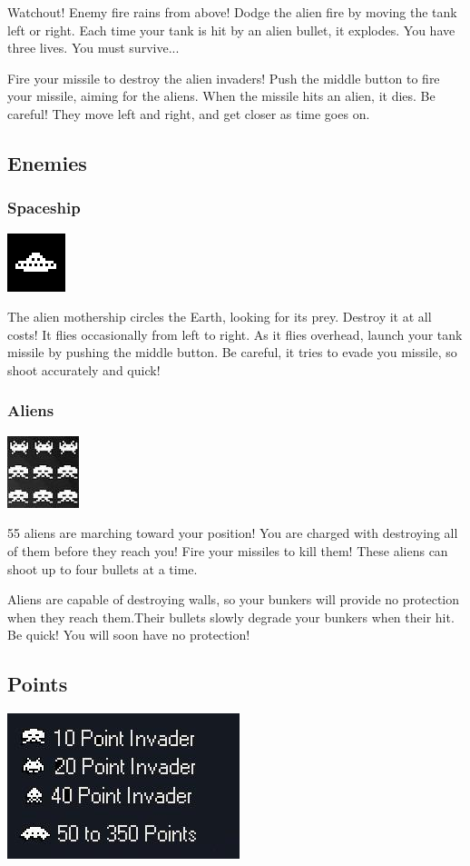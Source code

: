 \documentclass[11pt,letter,oneside]{report}
\begin{document}
Watchout! Enemy fire rains from above! Dodge the alien fire by moving the tank left or right. Each time your tank is hit by an alien bullet, it explodes. You have three lives.  You must survive...

Fire your missile to destroy the alien invaders! Push the middle button to fire your missile, aiming for the aliens. When the missile hits an alien, it dies. Be careful! They move left and right, and get closer as time goes on.

\subsection{Enemies}

\subsubsection{Spaceship}
\includegraphics[]{big-alien.png}

The alien mothership circles the Earth, looking for its prey. Destroy it at all costs! It flies occasionally from left to right. As it flies overhead, launch your tank missile by pushing the middle button. Be careful, it tries to evade you missile, so shoot accurately and quick!


\subsubsection{Aliens}
\includegraphics[]{aliens.jpg}

55 aliens are marching toward your position! You are charged with destroying all of them before they reach you! Fire your missiles to kill them! These aliens can shoot up to four bullets at a time. 

Aliens are capable of destroying walls, so your bunkers will provide no protection when they reach them.Their bullets slowly degrade your bunkers when their hit. Be quick! You will soon have no protection!

\subsection{Points}
\includegraphics[]{scoring.jpg}
\end{document}
